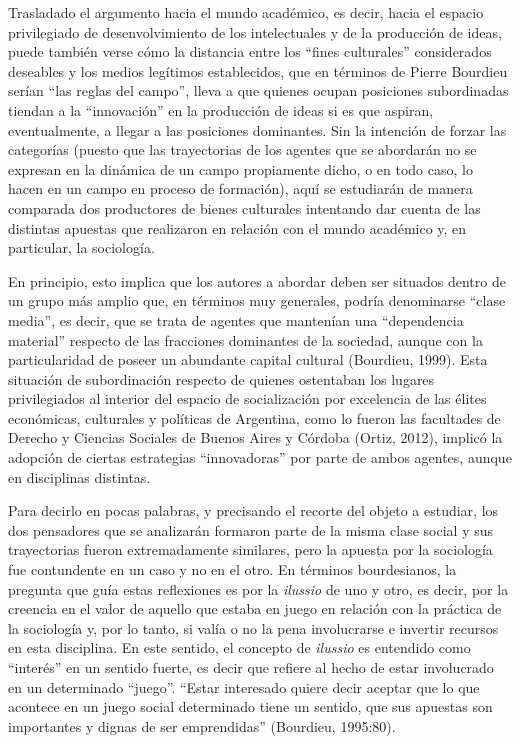Trasladado el argumento hacia el mundo académico, es decir, hacia el espacio privilegiado de desenvolvimiento de los intelectuales y de la producción de ideas, puede también verse cómo la distancia entre los \enquote{fines culturales} considerados deseables y los medios legítimos establecidos, que en términos de Pierre Bourdieu serían \enquote{las reglas del campo}, lleva a que quienes ocupan posiciones subordinadas tiendan a la \enquote{innovación} en la producción de ideas si es que aspiran, eventualmente, a llegar a las posiciones dominantes. Sin la intención de forzar las categorías (puesto que las trayectorias de los agentes que se abordarán no se expresan en la dinámica de un campo propiamente dicho, o en todo caso, lo hacen en un campo en proceso de formación), aquí se estudiarán de manera comparada dos productores de bienes culturales intentando dar cuenta de las distintas apuestas que realizaron en relación con el mundo académico y, en particular, la sociología.

En principio, esto implica que los autores a abordar deben ser situados dentro de un grupo más amplio que, en términos muy generales, podría denominarse \enquote{clase media}, es decir, que se trata de agentes que mantenían una \enquote{dependencia material} respecto de las fracciones dominantes de la sociedad, aunque con la particularidad de poseer un abundante capital cultural (Bourdieu, 1999). Esta situación de subordinación respecto de quienes ostentaban los lugares privilegiados al interior del espacio de socialización por excelencia de las élites económicas, culturales y políticas de Argentina, como lo fueron las facultades de Derecho y Ciencias Sociales de Buenos Aires y Córdoba \parencite{277-AGUERO2017}(Ortiz, 2012), implicó la adopción de ciertas estrategias \enquote{innovadoras} por parte de ambos agentes, aunque en disciplinas distintas.

Para decirlo en pocas palabras, y precisando el recorte del objeto a estudiar, los dos pensadores que se analizarán formaron parte de la misma clase social y sus trayectorias fueron extremadamente similares, pero la apuesta por la sociología fue contundente en un caso y no en el otro. En términos bourdesianos, la pregunta que guía estas reflexiones es por la \emph{ilussio} de uno y otro, es decir, por la creencia en el valor de aquello que estaba en juego en relación con la práctica de la sociología y, por lo tanto, si valía o no la pena involucrarse e invertir recursos en esta disciplina. En este sentido, el concepto de \emph{ilussio} es entendido como \enquote{interés} en un sentido fuerte, es decir que refiere al hecho de estar involucrado en un determinado \enquote{juego}. \enquote{Estar interesado quiere decir aceptar que lo que acontece en un juego social determinado tiene un sentido, que sus apuestas son importantes y dignas de ser emprendidas} (Bourdieu, 1995:80).

